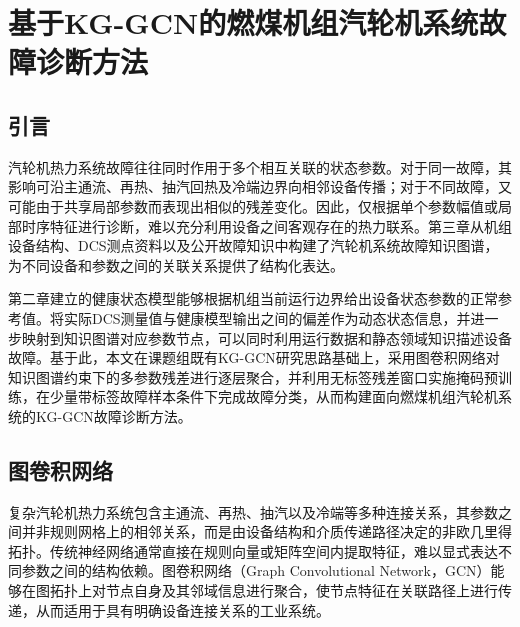 \section{基于KG-GCN的燃煤机组汽轮机系统故障诊断方法}
\label{sec:kg_gcn_v4}

\subsection{引言}

汽轮机热力系统故障往往同时作用于多个相互关联的状态参数。对于同一故障，其影响可沿主通流、再热、抽汽回热及冷端边界向相邻设备传播；对于不同故障，又可能由于共享局部参数而表现出相似的残差变化。因此，仅根据单个参数幅值或局部时序特征进行诊断，难以充分利用设备之间客观存在的热力联系。第三章从机组设备结构、DCS测点资料以及公开故障知识中构建了汽轮机系统故障知识图谱，为不同设备和参数之间的关联关系提供了结构化表达。

第二章建立的健康状态模型能够根据机组当前运行边界给出设备状态参数的正常参考值。将实际DCS测量值与健康模型输出之间的偏差作为动态状态信息，并进一步映射到知识图谱对应参数节点，可以同时利用运行数据和静态领域知识描述设备故障。基于此，本文在课题组既有KG-GCN研究思路\cite{YangHaodong2026CFB}基础上，采用图卷积网络对知识图谱约束下的多参数残差进行逐层聚合，并利用无标签残差窗口实施掩码预训练，在少量带标签故障样本条件下完成故障分类，从而构建面向燃煤机组汽轮机系统的KG-GCN故障诊断方法。

\subsection{图卷积网络}
\label{subsec:gcn_theory_v4}

复杂汽轮机热力系统包含主通流、再热、抽汽以及冷端等多种连接关系，其参数之间并非规则网格上的相邻关系，而是由设备结构和介质传递路径决定的非欧几里得拓扑。传统神经网络通常直接在规则向量或矩阵空间内提取特征，难以显式表达不同参数之间的结构依赖。图卷积网络（Graph Convolutional Network，GCN）能够在图拓扑上对节点自身及其邻域信息进行聚合，使节点特征在关联路径上进行传递，从而适用于具有明确设备连接关系的工业系统\cite{Kipf2017GCN}。

